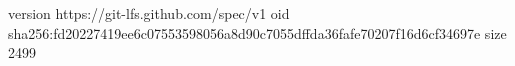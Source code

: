 version https://git-lfs.github.com/spec/v1
oid sha256:fd20227419ee6c07553598056a8d90c7055dffda36fafe70207f16d6cf34697e
size 2499
